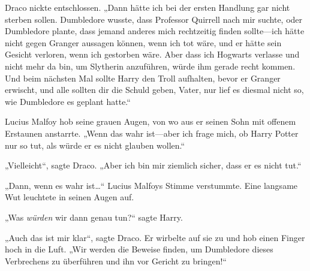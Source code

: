 Draco nickte entschlossen.
„Dann hätte ich bei der ersten Handlung gar nicht sterben sollen. Dumbledore wusste, dass Professor Quirrell nach mir suchte, oder Dumbledore plante, dass jemand anderes mich rechtzeitig finden sollte—ich hätte nicht gegen Granger aussagen können, wenn ich tot wäre, und er hätte sein Gesicht verloren, wenn ich gestorben wäre. Aber dass ich Hogwarts verlasse und nicht mehr da bin, um Slytherin anzuführen, würde ihm gerade recht kommen. Und beim nächsten Mal sollte Harry den Troll aufhalten, bevor er Granger erwischt, und alle sollten dir die Schuld geben, Vater, nur lief es diesmal nicht so, wie Dumbledore es geplant hatte.“

Lucius Malfoy hob seine grauen Augen, von wo aus er seinen Sohn mit offenem Erstaunen anstarrte. „Wenn das wahr ist—aber ich frage mich, ob Harry Potter nur so tut, als würde er es nicht glauben wollen.“

„Vielleicht“, sagte Draco. „Aber ich bin mir ziemlich sicher, dass er es nicht tut.“

„Dann, wenn es wahr ist…“
Lucius Malfoys Stimme verstummte. Eine langsame Wut leuchtete in seinen Augen auf.

„Was \emph{würden} wir dann genau tun?“ sagte Harry.

„Auch das ist mir klar“, sagte Draco. Er wirbelte auf sie zu und hob einen Finger hoch in die Luft. „Wir werden die Beweise finden, um Dumbledore dieses Verbrechens zu überführen und ihn vor Gericht zu bringen!“

